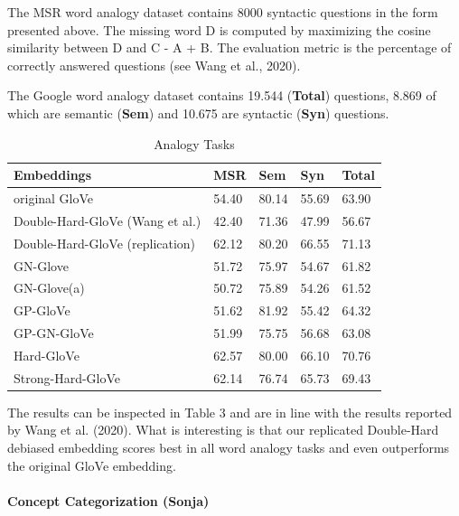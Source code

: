 \documentclass[
  english,
  man,floatsintext]{apa6}
\let\oldparagraph\paragraph
\renewcommand{\paragraph}[1]{\oldparagraph{#1}\mbox{}}
\begin{document}
The MSR word analogy dataset contains 8000 syntactic questions in the form presented above. The missing word D is computed by maximizing the cosine similarity between D and C - A + B. The evaluation metric is the percentage of correctly answered questions (see Wang et al., 2020).

The Google word analogy dataset contains 19.544 (\textbf{Total}) questions, 8.869 of which are semantic (\textbf{Sem}) and 10.675 are syntactic (\textbf{Syn}) questions.

\begin{table}[tbp]

\begin{center}
\begin{threeparttable}

\caption{\label{tab:table 3}Analogy Tasks}

\begin{tabular}{lllll}
\toprule
Embeddings & MSR & Sem & Syn & Total\\
\midrule
original GloVe & 54.40 & 80.14 & 55.69 & 63.90\\
Double-Hard-GloVe (Wang et al.) & 42.40 & 71.36 & 47.99 & 56.67\\
Double-Hard-GloVe (replication) & 62.12 & 80.20 & 66.55 & 71.13\\
GN-Glove & 51.72 & 75.97 & 54.67 & 61.82\\
GN-Glove(a) & 50.72 & 75.89 & 54.26 & 61.52\\
GP-GloVe & 51.62 & 81.92 & 55.42 & 64.32\\
GP-GN-GloVe & 51.99 & 75.75 & 56.68 & 63.08\\
Hard-GloVe & 62.57 & 80.00 & 66.10 & 70.76\\
Strong-Hard-GloVe & 62.14 & 76.74 & 65.73 & 69.43\\
\bottomrule
\end{tabular}

\end{threeparttable}
\end{center}

\end{table}

The results can be inspected in Table 3 and are in line with the results reported by Wang et al. (2020). What is interesting is that our replicated Double-Hard debiased embedding scores best in all word analogy tasks and even outperforms the original GloVe embedding.

\hypertarget{concept-categorization-sonja}{%
\paragraph{Concept Categorization (Sonja)}\label{concept-categorization-sonja}}
\end{document}
